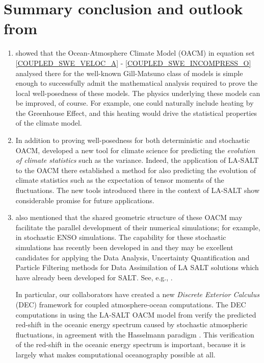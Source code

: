 \documentclass[11pt, oneside]{article}   	%
\numberwithin{equation}{section}
\theoremstyle{plain}
\theoremstyle{definition}
\theoremstyle{remark}
\newcommand{\<}{\langle}
\renewcommand{\>}{\rangle}
\begin{document}
\section{Summary conclusion and outlook from \cite{crisan2023implementation}}\label{Sec4}

\begin{enumerate}
    \item \cite{crisan2023implementation} showed that the Ocean-Atmosphere Climate Model (OACM) in equation set \eqref{COUPLED_SWE_VELOC_A} - \eqref{COUPLED_SWE_INCOMPRESS_O} analysed there for the well-known Gill-Matsuno class of models is simple enough to successfully admit the mathematical analysis required to prove the local well-posedness of these models. The physics underlying these models can be improved, of course. For example, one could naturally include heating by the Greenhouse Effect, and this heating would drive the statistical properties of the climate model. 

    \item In addition to proving well-posedness for both deterministic and stochastic OACM, \cite{crisan2023implementation} developed a new tool for climate science for predicting the \emph{evolution of climate statistics} such as the variance. Indeed, the application of LA-SALT to the OACM there established a method for also predicting the evolution of climate statistics such as the expectation of tensor moments of the fluctuations. The new tools introduced there in the context of LA-SALT show considerable promise for future applications.
    
    \item \cite{crisan2023implementation} also mentioned that the shared geometric structure of these OACM may facilitate the parallel development of their numerical simulations; for example, in stochastic ENSO simulations. The capability for these stochastic simulations has recently been developed in \cite{sharma2026structure} and they may be excellent candidates for applying the Data Analysis, Uncertainty Quantification and Particle Filtering methods for Data Assimilation of LA SALT solutions which have already been developed for SALT. See, e.g.,  \cite{CCHOS18a,CCHOS18b}. 
    
In particular, our collaborators have created a new \emph{Discrete Exterior Calculus} (DEC) framework for coupled atmosphere-ocean computations. The DEC computations in \cite{sharma2026structure} using the LA-SALT OACM model from \cite{crisan2023implementation} verify the predicted red-shift in the oceanic energy spectrum caused by stochastic atmospheric fluctuations, in agreement with the Hasselmann paradigm \cite{hasselmann1976stochastic}. This verification of the red-shift in the oceanic energy spectrum is important, because it is largely what makes computational oceanography possible at all.

\end{enumerate}
\end{document}
